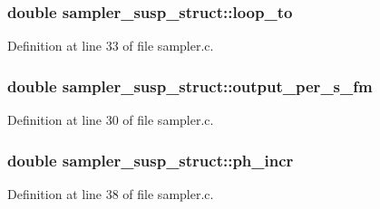 \subsubsection[{\texorpdfstring{loop\+\_\+to}{loop_to}}]{\setlength{\rightskip}{0pt plus 5cm}double sampler\+\_\+susp\+\_\+struct\+::loop\+\_\+to}\hypertarget{structsampler__susp__struct_a1979570b411c3c89712b8c2916164a67}{}\label{structsampler__susp__struct_a1979570b411c3c89712b8c2916164a67}


Definition at line 33 of file sampler.\+c.

\subsubsection[{\texorpdfstring{output\+\_\+per\+\_\+s\+\_\+fm}{output_per_s_fm}}]{\setlength{\rightskip}{0pt plus 5cm}double sampler\+\_\+susp\+\_\+struct\+::output\+\_\+per\+\_\+s\+\_\+fm}\hypertarget{structsampler__susp__struct_a9e5d3473b0aff6e169325ef9071ad835}{}\label{structsampler__susp__struct_a9e5d3473b0aff6e169325ef9071ad835}


Definition at line 30 of file sampler.\+c.

\subsubsection[{\texorpdfstring{ph\+\_\+incr}{ph_incr}}]{\setlength{\rightskip}{0pt plus 5cm}double sampler\+\_\+susp\+\_\+struct\+::ph\+\_\+incr}\hypertarget{structsampler__susp__struct_aad74627b030507500a90d3055f4190d7}{}\label{structsampler__susp__struct_aad74627b030507500a90d3055f4190d7}


Definition at line 38 of file sampler.\+c.

